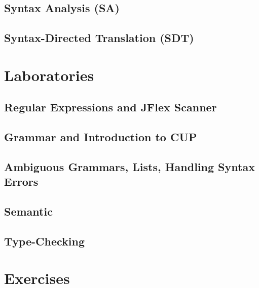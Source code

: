 \documentclass[pdfa,cucitura]{toptesi}
\begin{document}
\chapter{Syntax Analysis (SA)}


\chapter{Syntax-Directed Translation (SDT)}




\part{Laboratories}
\chapter{Regular Expressions and JFlex Scanner}


\chapter{Grammar and Introduction to CUP}

\chapter{Ambiguous Grammars, Lists, Handling Syntax Errors}

\chapter{Semantic}

\chapter{Type-Checking}

\part{Exercises}
\end{document}
